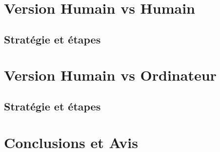 \documentclass[20pt]{report}
\begin{document}
   \clearpage
   

     \begin{center}
    \Huge 
     \end{center}      
    
     \begin{flushleft}
     \renewcommand{\thesection}{\arabic{section}}
          \section{Version Humain vs Humain}
          \parindent=2cm \subsection{Stratégie et étapes}
      \vspace{0.3cm}
      \parindent=2cm
     \section{Version Humain vs Ordinateur}
      \subsection{Stratégie et étapes}

      \vspace{0.3cm}
    
     
    \section{Conclusions et Avis}
     
   \end{flushleft}
       
       
   
   
   \clearpage
  
   \pagestyle{fancy}
   
\end{document}
